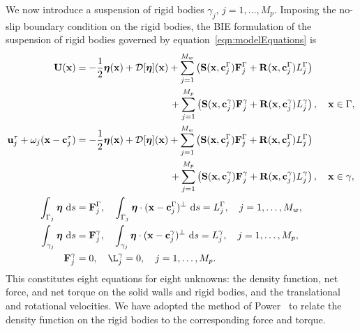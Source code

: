 \documentclass[preprint, 10pt]{elsarticle}
\begin{document}
We now introduce a suspension of rigid bodies $\gamma_j$,
$j=1,\ldots,M_p$.  Imposing the no-slip boundary condition on the rigid
bodies, the BIE formulation of the suspension of rigid bodies governed
by equation~\eqref{eqn:modelEquations} is
\begin{subequations}
  \label{eqn:BIEformulation}
  \begin{align}
    \UU(\xx) &= -\frac{1}{2}\eeta(\xx) + \DD[\eeta](\xx) +
    \sum_{j=1}^{M_w} \left(\mathbf{S}(\xx,\cc^\Gamma_j)\FF^\Gamma_j + 
      \mathbf{R}(\xx,\cc^\Gamma_j)L^\Gamma_j\right)  \nonumber \\
      &\hspace{96pt}+\sum_{j=1}^{M_p} \left(\mathbf{S}(\xx,\cc^\gamma_j)\FF^\gamma_j + 
      \mathbf{R}(\xx,\cc^\gamma_j)L^\gamma_j\right), 
    \quad \xx \in \Gamma, \label{eqn:BIEformulation1} \\
  \uu^\tau_j + \omega_j(\xx - \cc_j^\tau) &=
    -\frac{1}{2}\eeta(\xx) + \DD[\eeta](\xx) + 
    \sum_{j=1}^{M_w} \left(\mathbf{S}(\xx,\cc^\Gamma_j)\FF^\Gamma_j + 
      \mathbf{R}(\xx,\cc^\Gamma_j)L^\Gamma_j\right) \nonumber \\
    &\hspace{96pt}+\sum_{j=1}^{M_p} \left(\mathbf{S}(\xx,\cc^\gamma_j)\FF^\gamma_j + 
      \mathbf{R}(\xx,\cc^\gamma_j)L^\gamma_j\right), 
    \quad \xx \in \gamma, \label{eqn:BIEformulation2} \\
  \int_{\Gamma_j} \eeta~\text{d}s &= \FF^\Gamma_j, \quad
  \int_{\Gamma_j} \eeta\cdot (\xx - \cc^\Gamma_j)^\perp~\text{d}s =
  L^\Gamma_j, \quad j=1,\ldots,M_w, \label{eqn:BIEformulation3} \\
  \int_{\gamma_j} \eeta~\text{d}s &= \FF^\gamma_j, \quad
  \int_{\gamma_j} \eeta\cdot (\xx - \cc^\gamma_j)^\perp~\text{d}s =
  L^\gamma_j,\quad j=1,\ldots,M_p, \label{eqn:BIEformulation4} \\
  \FF^\gamma_j &= 0, \quad \L^\gamma_j = 0,\quad j=1,\ldots,M_p.
  \label{eqn:BIEformulation5}
\end{align}
\end{subequations}
This constitutes eight equations for eight unknowns: the density
function, net force, and net torque on the solid walls and rigid bodies,
and the translational and rotational velocities.  We have adopted the
method of Power~\cite{Power1993} to relate the density function on the
rigid bodies to the corresponding force and torque. 
\end{document}
